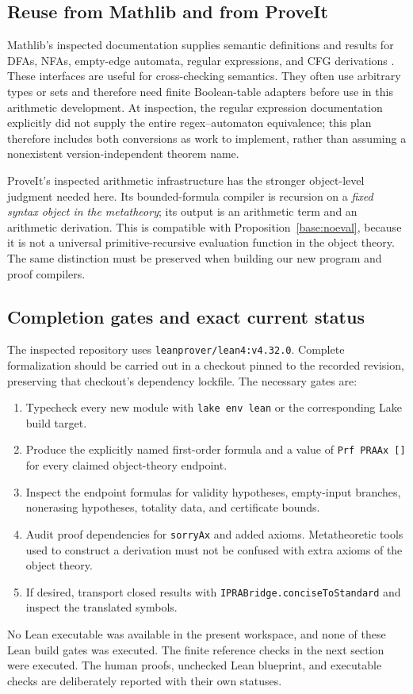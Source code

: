\subsection{Reuse from Mathlib and from ProveIt}

Mathlib's inspected documentation supplies semantic definitions and results
for DFAs, NFAs, empty-edge automata, regular expressions, and CFG derivations
\cite{MathlibDFA,MathlibNFA,MathlibEpsilon,MathlibRegex,MathlibCFG}.
These interfaces are useful for cross-checking semantics. They often use
arbitrary types or sets and therefore need finite Boolean-table adapters
before use in this arithmetic development. At inspection, the regular
expression documentation explicitly did not supply the entire
regex--automaton equivalence; this plan therefore includes both
conversions as work to implement, rather than assuming a nonexistent
version-independent theorem name.

ProveIt's inspected arithmetic infrastructure has the stronger object-level
judgment needed here. Its bounded-formula compiler is recursion on a
\emph{fixed syntax object in the metatheory}; its output is an arithmetic
term and an arithmetic derivation. This is compatible with
Proposition~\ref{base:noeval}, because it is not a universal primitive-recursive
evaluation function in the object theory. The same distinction must be
preserved when building our new program and proof compilers.

\subsection{Completion gates and exact current status}

The inspected repository uses \texttt{leanprover/lean4:v4.32.0}. Complete
formalization should be carried out in a checkout pinned to the recorded
revision, preserving that checkout's dependency lockfile. The necessary
gates are:
\begin{enumerate}
\item Typecheck every new module with \texttt{lake env lean} or the
corresponding Lake build target.
\item Produce the explicitly named first-order formula and a value of
\texttt{Prf PRAAx []} for every claimed object-theory endpoint.
\item Inspect the endpoint formulas for validity hypotheses, empty-input
branches, nonerasing hypotheses, totality data, and certificate bounds.
\item Audit proof dependencies for \texttt{sorryAx} and added axioms.
Metatheoretic tools used to construct a derivation must not be confused
with extra axioms of the object theory.
\item If desired, transport closed results with
\texttt{IPRABridge.conciseToStandard} and inspect the translated symbols.
\end{enumerate}
No Lean executable was available in the present workspace, and none of
these Lean build gates was executed. The finite reference checks in the
next section were executed. The human proofs, unchecked Lean blueprint,
and executable checks are deliberately reported with their own statuses.
